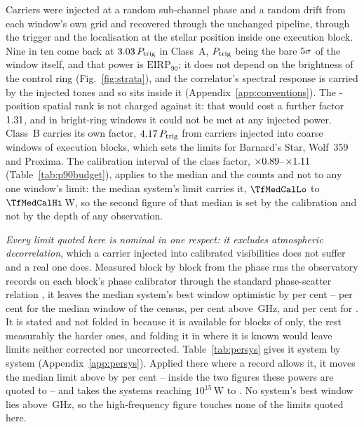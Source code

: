 Carriers were injected at a random sub-channel phase and a random drift from
each window's own grid and recovered through the unchanged pipeline, through
the trigger and the localisation at the stellar position inside one execution
block. Nine in ten come back at $3.03\,P_{\rm trig}$ in Class~A,
$P_{\rm trig}$ being the bare $5\sigma$ of the window itself, and
that power is $\mathrm{EIRP}_{90}$; it does not depend on the brightness of the
control ring (Fig.~\ref{fig:strata}), and the correlator's spectral response is
carried by the injected tones and so sits inside it
(Appendix~\ref{app:conventions}). The \NCtrl-position spatial rank is not
charged against it: that would cost a further factor $1.31$, and in
\SensNRingHiUnres{} bright-ring windows it could not be met at any injected
power. Class~B carries its own factor, $4.17\,P_{\rm trig}$ from
\SensNToneCoarse{} carriers injected into \SensNInjCoarse{} coarse windows of
\SensNInjCoarseBlock{} execution blocks, which sets the limits for Barnard's
Star, Wolf~359 and Proxima. The calibration interval of the class factor,
$\times0.89$--$\times1.11$ (Table~\ref{tab:p90budget}), applies to
the median and the counts and not to any one window's limit: the median
system's limit carries it, $\TfMedCalLo$ to $\TfMedCalHi$\,W, so the second
figure of that median is set by the calibration and not by the depth of any
observation.

\emph{Every limit quoted here is nominal in one respect: it excludes
atmospheric decorrelation}, which a carrier injected into calibrated
visibilities does not suffer and a real one does. Measured block by block from
the phase rms the observatory records on each block's phase calibrator
\citep[\S\S10.4.11, 11.3.1]{ALMAHandbook} through the standard phase-scatter
relation \citep[Eq.~3]{Richards2022}, it leaves the median system's best window
optimistic by \NmDecSysMedPct{} per cent -- \SensDecorPct{} per cent for the
median window of the census, \SensDecorHiPct{} per cent above
\SensDecorHiGHz\,GHz, and \NmDecSysWorstPct{} per cent for
\NmDecSysWorstName{}. It is stated and not folded in because it is available
for \SensDecorNBlk{} blocks of \SensDecorNBlkTot{} only, the rest measurably
the harder ones, and folding it in where it is known would leave limits
neither corrected nor uncorrected. Table~\ref{tab:persys} gives it system by system
(Appendix~\ref{app:persys}). Applied there where a record allows it, it moves
the median limit above by \NmDecAdjShiftPct{} per cent -- inside the two
figures these powers are quoted to -- and takes the \NSysEfifteen{} systems
reaching $10^{15}$\,W to \NmDecAdjNEfifteen{}. No system's best window lies
above \SensDecorHiGHz\,GHz, so the high-frequency figure touches none of the
limits quoted here.

